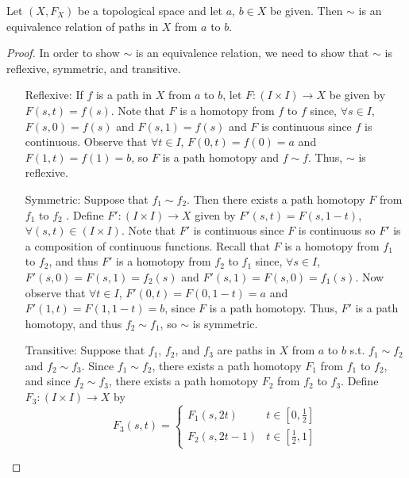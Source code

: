 \begin{theorem}
	Let $(X, F_X)$ be a topological space and let $a$, $b \in X$ be given. Then $\sim$ is an equivalence relation of paths in $X$ from $a$ to $b$. 
\end{theorem}
\begin{proof}
	In order to show $\sim$ is an equivalence relation, we need to show that $\sim$ is reflexive, symmetric, and transitive. 
	\begin{itemize}
		\item[Reflexive:] If $f$ is a path in $X$ from $a$ to $b$, let $F: (I \times I) \rightarrow X$ be given by $F(s,t) = f(s)$. Note that $F$ is a homotopy from $f$ to $f$ since, $\forall s \in I$, $F(s,0) = f(s)$ and $F(s,1) = f(s)$ and $F$ is continuous since $f$ is continuous. Observe that $\forall t \in I$, $F(0, t) = f(0) = a$ and $F(1, t) = f(1) = b$, so $F$ is a path homotopy and $f \sim f$. Thus, $\sim$ is reflexive. 
		\item[Symmetric:] Suppose that $f_1 \sim f_2$. Then there exists a path homotopy $F$ from $f_1$ to $f_2$ . Define $F': (I \times I) \rightarrow X$ given by $F'(s,t) = F(s, 1-t)$, $\forall (s,t) \in (I \times I)$. Note that $F'$ is continuous since $F$ is continuous so $F'$ is a composition of continuous functions. Recall that $F$ is a homotopy from $f_1$ to $f_2$, and thus $F'$ is a homotopy from $f_2$ to $f_1$ since, $\forall s \in I$, $F'(s, 0) = F(s, 1) = f_2(s)$ and $F'(s, 1) = F(s, 0) = f_1(s)$. Now observe that $\forall t \in I$, $F'(0,t) = F(0,1-t) = a$ and $F'(1,t) = F(1, 1-t) = b$, since $F$ is a path homotopy. Thus, $F'$ is a path homotopy, and thus $f_2 \sim f_1$, so $\sim$ is symmetric. 
		\item [Transitive:] Suppose that $f_1$, $f_2$, and $f_3$ are paths in $X$ from $a$ to $b$ s.t. $f_1 \sim f_2$ and $f_2 \sim f_3$. Since $f_1 \sim f_2$, there exists a path homotopy $F_1$ from $f_1$ to $f_2$, and since $f_2 \sim f_3$, there exists a path homotopy $F_2$ from $f_2$ to $f_3$. Define $F_3: (I \times I) \rightarrow X$ by 
		\begin{displaymath}
			F_3(s,t) = 
			\begin{cases}
				F_1(s,2t) & t \in [0, \frac{1}{2}]\\
				F_2(s,2t - 1) & t \in [\frac{1}{2}, 1] 
			\end{cases}
		\end{displaymath}
		

\end{itemize}
\end{proof}
